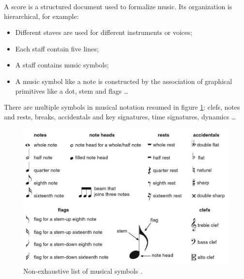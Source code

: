 \documentclass[11pt]{sdm}
\begin{document}
A score is a structured document used to formalize music.
Its organization is hierarchical, for example:
\begin{itemize}
  \item Different staves are used for different instruments or voices;
  \item Each staff contain five lines;
  \item A staff contains music symbols;
  \item A music symbol like a note is constructed by the association of graphical primitives like a dot, stem and flags \ldots
\end{itemize}
There are multiple symbols in musical notation resumed in figure \ref{list_symbols}: clefs, notes and rests, breaks, accidentals and key signatures, time signatures, dynamics \ldots 
\begin{figure}[btp]
  \centering
  \includegraphics[scale=1]{img/list_symbols}
  \caption{\label{list_symbols} Non-exhaustive list of musical symbols \cite{fornes_analysis_2014}. }
\end{figure}
\end{document}
